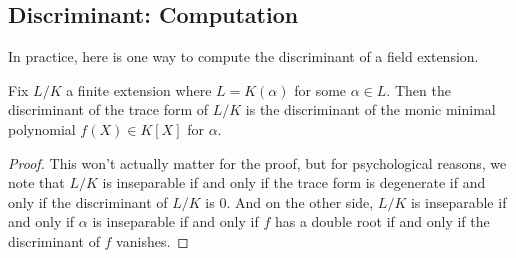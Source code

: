 \documentclass[../notes.tex]{subfiles}
\begin{document}
\subsection{Discriminant: Computation}
In practice, here is one way to compute the discriminant of a field extension.
\begin{prop}
	Fix $L/K$ a finite extension where $L=K(\alpha)$ for some $\alpha\in L.$ Then the discriminant of the trace form of $L/K$ is the discriminant of the monic minimal polynomial $f(X)\in K[X]$ for $\alpha.$
\end{prop}
\begin{proof}
	This won't actually matter for the proof, but for psychological reasons, we note that $L/K$ is inseparable if and only if the trace form is degenerate if and only if the discriminant of $L/K$ is $0.$ And on the other side, $L/K$ is inseparable if and only if $\alpha$ is inseparable if and only if $f$ has a double root if and only if the discriminant of $f$ vanishes.
	

\end{proof}
\end{document}
